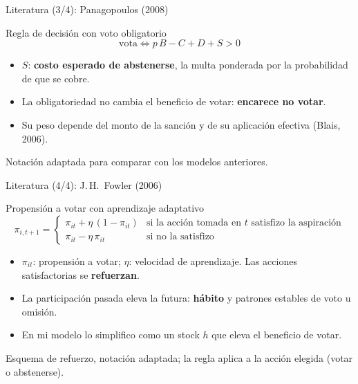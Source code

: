 \documentclass[aspectratio=169,11pt,xcolor=table]{beamer}
\newcommand{\hl}[1]{\textcolor{upaccent}{\textbf{#1}}}
\begin{document}
\begin{frame}{Literatura (3/4): Panagopoulos (2008)}
  \begin{block}{Regla de decisión con voto obligatorio}
    \[ \text{vota} \iff p\,B - C + D + S > 0 \]
  \end{block}
  \vspace{0.2cm}
  \begin{itemize}
    \item $S$: \hl{costo esperado de abstenerse}, la multa ponderada por la probabilidad de que se cobre.
    \item La obligatoriedad no cambia el beneficio de votar: \textbf{encarece no votar}.
    \item Su peso depende del monto de la sanción y de su aplicación efectiva (Blais, 2006).
  \end{itemize}
  \vspace{0.1cm}
  {\scriptsize\color{upgray} Notación adaptada para comparar con los modelos anteriores.\par}
\end{frame}

\begin{frame}{Literatura (4/4): J.\,H.\ Fowler (2006)}
  \begin{block}{Propensión a votar con aprendizaje adaptativo}
    \[ \pi_{i,t+1}=\begin{cases} \pi_{it}+\eta\,(1-\pi_{it}) & \text{si la acción tomada en } t \text{ satisfizo la aspiración}\\[0.1cm] \pi_{it}-\eta\,\pi_{it} & \text{si no la satisfizo}\end{cases} \]
  \end{block}
  \vspace{0.1cm}
  \begin{itemize}
    \item $\pi_{it}$: propensión a votar; $\eta$: velocidad de aprendizaje. Las acciones satisfactorias se \hl{refuerzan}.
    \item La participación pasada eleva la futura: \textbf{hábito} y patrones estables de voto u omisión.
    \item En mi modelo lo simplifico como un stock $h$ que eleva el beneficio de votar.
  \end{itemize}
  \vspace{0.05cm}
  {\scriptsize\color{upgray} Esquema de refuerzo, notación adaptada; la regla aplica a la acción elegida (votar o abstenerse).\par}
\end{frame}
\end{document}
